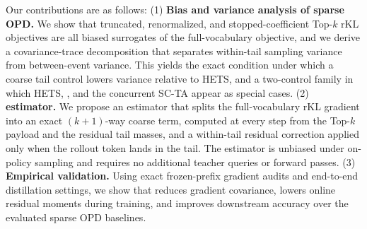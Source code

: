 Our contributions are as follows:
(1) \textbf{Bias and variance analysis of sparse OPD.} We show that truncated, renormalized, and stopped-coefficient Top-$k$ rKL objectives are all biased surrogates of the full-vocabulary objective, and we derive a covariance-trace decomposition that separates within-tail sampling variance from between-event variance. This yields the exact condition under which a coarse tail control lowers variance relative to HETS, and a two-control family in which HETS, \method{}, and the concurrent SC-TA \citep{huang2026tail} appear as special cases.
(2) \textbf{\method{} estimator.} We propose an estimator that splits the full-vocabulary rKL gradient into an exact $(k+1)$-way coarse term, computed at every step from the Top-$k$ payload and the residual tail masses, and a within-tail residual correction applied only when the rollout token lands in the tail. The estimator is unbiased under on-policy sampling and requires no additional teacher queries or forward passes.
(3) \textbf{Empirical validation.} Using exact frozen-prefix gradient audits and end-to-end distillation settings, we show that \method{} reduces gradient covariance, lowers online residual moments during training, and improves downstream accuracy over the evaluated sparse OPD baselines.
